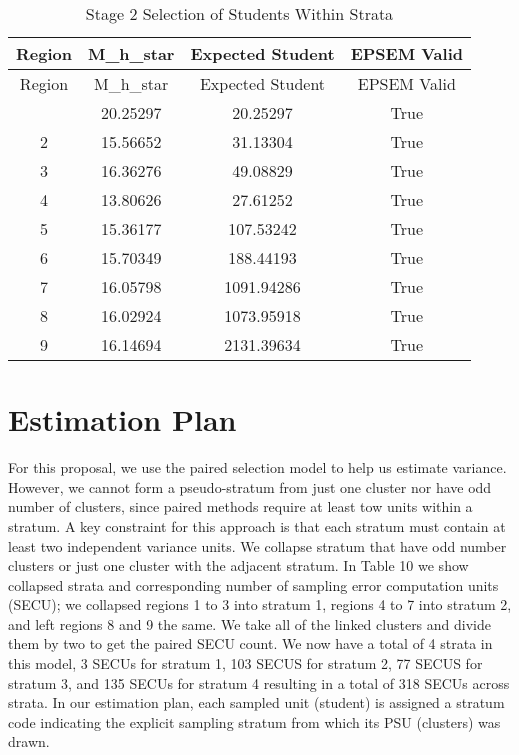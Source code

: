 \documentclass[
  12pt]{article}
\begin{document}
\begin{longtable}[]{@{}cccc@{}}
\caption{Stage 2 Selection of Students Within Strata}\tabularnewline
\toprule\noalign{}
Region & M\_h\_star & Expected Student & EPSEM Valid \\
\midrule\noalign{}
\endfirsthead
\toprule\noalign{}
Region & M\_h\_star & Expected Student & EPSEM Valid \\
\midrule\noalign{}
\endhead
\bottomrule\noalign{}
\endlastfoot
1 & 20.25297 & 20.25297 & True \\
2 & 15.56652 & 31.13304 & True \\
3 & 16.36276 & 49.08829 & True \\
4 & 13.80626 & 27.61252 & True \\
5 & 15.36177 & 107.53242 & True \\
6 & 15.70349 & 188.44193 & True \\
7 & 16.05798 & 1091.94286 & True \\
8 & 16.02924 & 1073.95918 & True \\
9 & 16.14694 & 2131.39634 & True \\
\end{longtable}

\subsection{}\label{section}

\section{Estimation Plan}\label{estimation-plan}

For this proposal, we use the paired selection model to help us estimate
variance. However, we cannot form a pseudo-stratum from just one cluster
nor have odd number of clusters, since paired methods require at least
tow units within a stratum. A key constraint for this approach is that
each stratum must contain at least two independent variance units. We
collapse stratum that have odd number clusters or just one cluster with
the adjacent stratum. In Table 10 we show collapsed strata and
corresponding number of sampling error computation units (SECU); we
collapsed regions 1 to 3 into stratum 1, regions 4 to 7 into stratum 2,
and left regions 8 and 9 the same. We take all of the linked clusters
and divide them by two to get the paired SECU count. We now have a total
of 4 strata in this model, 3 SECUs for stratum 1, 103 SECUS for stratum
2, 77 SECUS for stratum 3, and 135 SECUs for stratum 4 resulting in a
total of 318 SECUs across strata. In our estimation plan, each sampled
unit (student) is assigned a stratum code indicating the explicit
sampling stratum from which its PSU (clusters) was drawn.
\end{document}
